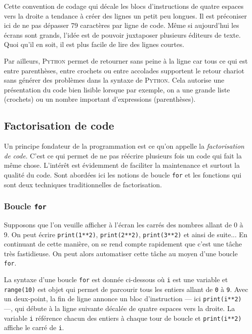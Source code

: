 Cette convention de codage qui décale les blocs d'instructions de quatre espaces vers la droite a tendance à créer des lignes un petit peu longues. Il est préconiser ici de ne pas dépasser 79 caractères par ligne de code. Même si aujourd'hui les écrans sont grands, l'idée est de pouvoir juxtaposer plusieurs éditeurs de texte. Quoi qu'il en soit, il est plus facile de lire des lignes courtes.

Par ailleurs, \textsc{Python} permet de retourner sans peine à la ligne car tous ce qui est entre parenthèses, entre crochets ou entre accolades supportent le retour chariot sans générer des problèmes dans la syntaxe de \textsc{Python}. Cela autorise une présentation du code bien lisible lorsque par exemple, on a une grande liste (crochets) ou un nombre important d'expressions (parenthèses).


\subsection[Factorisation de code]{Factorisation de code}
\label{sub:XI.3.2}

Un principe fondateur de la programmation est ce qu'on appelle la \emph{factorisation de code}. C'est ce qui permet de ne pas réécrire plusieurs fois un code qui fait la même chose. L'intérêt est évidemment de faciliter la maintenance et surtout la qualité du code. Sont abordées ici les notions de boucle \texttt{for} et les fonctions qui sont deux techniques traditionnelles de factorisation.

\subsubsection[Boucle {\normalfont\texttt{for}}]{Boucle {\normalfont\texttt{for}}}
\label{subsub:XI.3.2.1}

Supposons que l'on veuille afficher à l'écran les carrés des nombres allant de 0 à 9. On peut écrire \texttt{print(1**2)}, \texttt{print(2**2)}, \texttt{print(3**2)} et ainsi de suite... En continuant de cette manière, on se rend compte rapidement que c'est une tâche très fastidieuse. On peut alors automatiser cette tâche au moyen d'une boucle \texttt{for}.


La syntaxe d'une boucle \texttt{for} est donnée ci-dessous où \texttt{i} est une variable et \texttt{range(10)} est objet qui permet de parcourir tous les entiers allant de \texttt{0} à \texttt{9}. Avec un deux-point, la fin de ligne annonce un bloc d'instruction ---  ici \texttt{print(i**2)} ---, qui débute à la ligne suivante décalée de quatre espaces vers la droite. La variable \texttt{i} référence chacun des entiers à chaque tour de boucle et \texttt{print(i**2)} affiche le carré de \texttt{i}.

